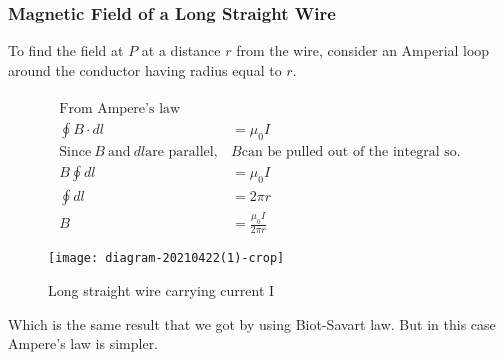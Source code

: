 \subsubsection{Magnetic Field of a Long Straight Wire}
To find the field at $P$ at a distance $r$ from the wire, consider an Amperial loop around the conductor having radius equal to $r$.\\
\begin{minipage}{0.65\textwidth}
\begin{align*}\\
\text{From Ampere's law }\\
\oint B\cdot dl&=\mu_0 I\\
\text{Since}\ B \ \text{and} \ dl \text{are parallel} , &B\text{can be pulled out of the integral so.}\\
B\oint dl&=\mu_0 I \hspace{2cm} \\ \oint dl&=2\pi r\\
B&=\frac{\mu_0 I}{2\pi r}
\end{align*}
\end{minipage}
\begin{minipage}{0.35\textwidth}
	\begin{figure}[H]
		\centering
		\texttt{[image: diagram-20210422(1)-crop]}
		\caption{Long straight wire carrying current I}
		\label{Long straight wire}
	\end{figure}
\end{minipage}


Which is the same result that we got by using Biot-Savart law. But in this case Ampere's law is simpler.\\
